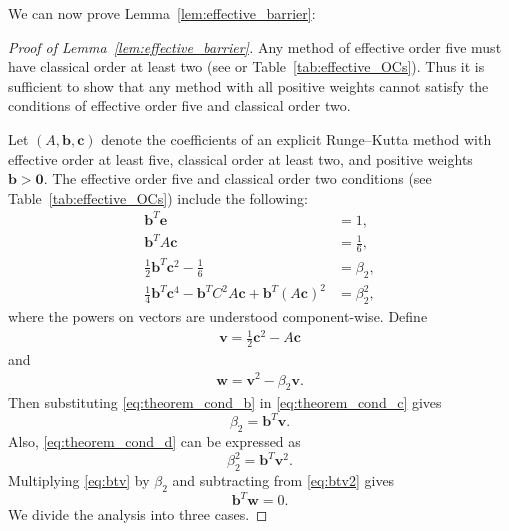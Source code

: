 We can now prove  Lemma~\ref{lem:effective_barrier}:
\begin{proof}[Proof of Lemma~\ref{lem:effective_barrier}]
	Any method of effective order five must have classical order at least two
	(see \cite{Butcher2008_book} or Table~\ref{tab:effective_OCs}).
    Thus it is sufficient to show that any method with all positive weights
    cannot satisfy the conditions of effective order five and classical order two.

    Let $(A,\bm{b},\bm{c})$ denote the coefficients of an explicit Runge--Kutta method with
    effective order at least five, classical order at least two, and positive 
    weights $\bm{b} > \bm{0}$.
    The effective order five and classical order two conditions
    (see Table~\ref{tab:effective_OCs}) include the following:
    \begin{subequations}\label{eq:theorem_cond}
    		\begin{align}
    			\bm{b}^T\bm{e} & = 1, \label{eq:theorem_cond_a} \\
             	\bm{b}^TA\bm{c} &= \frac{1}{6}, \label{eq:theorem_cond_b} \\
            	\frac{1}{2}\bm{b}^T\bm{c}^2 - \frac{1}{6} &= \beta_2, \label{eq:theorem_cond_c} \\
            	\frac{1}{4}\bm{b}^T\bm{c}^4 - \bm{b}^TC^2A\bm{c} + \bm{b}^T(A\bm{c})^2 &= \beta_2^2, \label{eq:theorem_cond_d}
        	\end{align}
	\end{subequations}
	where the powers on vectors are understood component-wise. 
	Define
	\begin{align*} 
		\bm{v} = \frac{1}{2}\bm{c}^2 - A\bm{c}
	\end{align*}
	and
	\begin{align}\label{eq:def_w}
		\bm{w} = \bm{v}^{2} - \beta_{2}\bm{v}.
	\end{align}
	Then substituting \eqref{eq:theorem_cond_b} in \eqref{eq:theorem_cond_c} gives
	\begin{equation}\label{eq:btv}
		\beta_2 = \bm{b}^T\bm{v}.
	\end{equation}
	Also, \eqref{eq:theorem_cond_d} can be expressed as
	\begin{equation}\label{eq:btv2}
		\beta_2^2 = \bm{b}^T\bm{v}^2.
	\end{equation}
        Multiplying \eqref{eq:btv} by $\beta_2$ and subtracting
        from \eqref{eq:btv2} gives
	\begin{equation}\label{eq:btw}
		\bm{b}^T\bm{w} = 0.
	\end{equation}
        We divide the analysis into three cases.

\end{proof}
